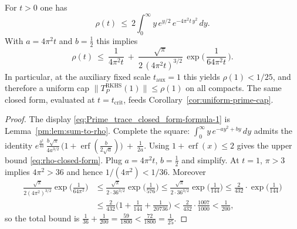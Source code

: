 \begin{lemma}\label{pm:lem:rho-closed-form}
For $t>0$ one has
\begin{equation}\label{eq:Prime_trace_closed_form-formula-1}
  \rho(t)\ \le\ 2\int_0^{\infty} y\,e^{y/2}\,e^{-4\pi^2 t\,y^2}\,dy.
\end{equation}
With $a=4\pi^2 t$ and $b=\tfrac12$ this implies
\begin{equation}\label{eq:rho-closed-form}
  \rho(t)\ \le\ \frac{1}{4\pi^2 t}\ +\ \frac{\sqrt\pi}{2\,(4\pi^2 t)^{3/2}}\,\exp\!\Big(\,\frac{1}{64\pi^2 t}\,\Big).
\end{equation}
In particular, at the auxiliary fixed scale $t_{\mathrm{aux}}=1$ this yields $\rho(1)<1/25$, and therefore a uniform cap $\|T_P^{\mathrm{RKHS}}(1)\|\le \rho(1)$ on all compacts. The same closed form, evaluated at $t=t_{\mathrm{crit}}$, feeds Corollary~\ref{cor:uniform-prime-cap}.
\end{lemma}
\begin{proof}
The display \eqref{eq:Prime_trace_closed_form-formula-1} is Lemma~\ref{pm:lem:sum-to-rho}. Complete the square: $\int_0^{\infty} y\,e^{-a y^2 + b y}\,dy$ admits the identity
\(
  e^{\frac{b^2}{4a}}\,\frac{b\sqrt\pi}{4a^{3/2}}\,\bigl(1+\operatorname{erf}(\tfrac{b}{2\sqrt a})\bigr)\ +\ \frac{1}{2a}.
\)
Using $1+\operatorname{erf}(x)\le2$ gives the upper bound \eqref{eq:rho-closed-form}. Plug $a=4\pi^2 t$, $b=\tfrac12$ and simplify.
At $t=1$, $\pi>3$ implies $4\pi^2>36$ and hence $1/(4\pi^2)<1/36$. Moreover
\begin{align*}
\frac{\sqrt{\pi}}{2(4\pi^2)^{3/2}}\exp\!\Big(\frac{1}{64\pi^2}\Big)
&\le \frac{\sqrt{\pi}}{2\cdot 36^{3/2}}\exp\!\Big(\frac{1}{576}\Big)
\le \frac{\sqrt{\pi}}{2\cdot 36^{3/2}}\exp\!\Big(\frac{1}{144}\Big)
\le \frac{2}{432}\cdot\exp\!\Big(\frac{1}{144}\Big) \\
&\le \frac{2}{432}\Big(1+\frac{1}{144}+\frac{1}{20736}\Big)
< \frac{2}{432}\cdot\frac{1007}{1000}
< \frac{1}{200},
\end{align*}
so the total bound is
\(
\tfrac{1}{36}+\tfrac{1}{200}
=\tfrac{59}{1800}
<\tfrac{72}{1800}
=\tfrac{1}{25}.
\)
\end{proof}

